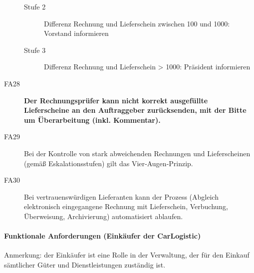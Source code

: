 \begin{description}
\begin{description}
    \item[Stufe 2] Differenz Rechnung und Lieferschein zwischen 100 und 1000: Vorstand informieren
    \item[Stufe 3] Differenz Rechnung und Lieferschein > 1000: Präsident informieren
  \end{description}
  \item[FA28] \textbf{Der Rechnungsprüfer kann nicht korrekt ausgefüllte Lieferscheine an den Auftraggeber zurücksenden, mit der Bitte um Überarbeitung (inkl. Kommentar).}
  \item[FA29] Bei der Kontrolle von stark abweichenden Rechnungen und Lieferscheinen (gemäß Eskalationsstufen) gilt das Vier­‐Augen­‐Prinzip.
  \item[FA30] Bei vertrauenswürdigen Lieferanten kann der Prozess (Abgleich elektronisch eingegangene Rechnung mit Lieferschein, Verbuchung, Überweisung, Archivierung) automatisiert ablaufen.
\end{description}

\paragraph{Funktionale Anforderungen (Einkäufer der CarLogistic)}

Anmerkung: der Einkäufer ist eine Rolle in der Verwaltung, der für den Einkauf sämtlicher Güter und Dienstleistungen zuständig ist.

